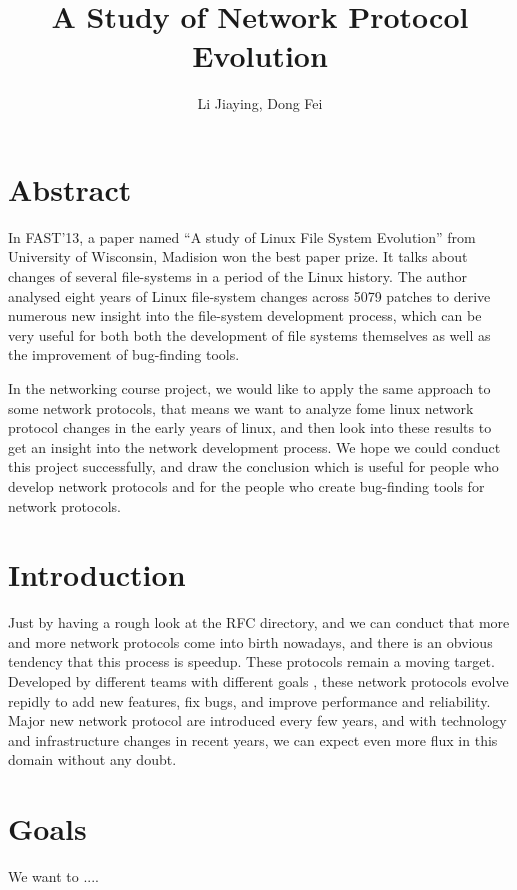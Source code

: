 \documentclass[10pt, a4paper, onecolumn, fleqn]{article}
\begin{document}
\title{A Study of Network Protocol Evolution}
\author{Li Jiaying, Dong Fei}
\maketitle

\pagestyle{empty}
\section*{Abstract}
In FAST'13, a paper named ``A study of Linux File System Evolution'' from University of Wisconsin, Madision won the best paper prize. It talks about changes of several file-systems in a period of the Linux history. The author analysed eight years of Linux file-system changes across 5079 patches to derive numerous new insight into the file-system development process, which can be very useful for both both the development of file systems themselves as well as the improvement of bug-finding tools. 

In the networking course project, we would like to apply the same approach to some network protocols, that means we want to analyze fome linux network protocol changes in the early years of linux, and then look into these results to get an insight into the network development process. We hope we could conduct this project successfully, and draw the conclusion which is useful for people who develop network protocols and for the people who create bug-finding tools for network protocols.



\section{Introduction}
Just by having a rough look at the RFC directory, and we can conduct that more and more network protocols come into birth nowadays, and there is an obvious tendency that this process is speedup.
These protocols remain a moving target. Developed by different teams with different goals , these network protocols evolve repidly to add new features, fix bugs, and improve performance and reliability. Major new network protocol are introduced every few years, and with technology and infrastructure changes in recent years, we can expect even more flux in this domain without any doubt.


\section{Goals}
We want to ....
\end{document}
